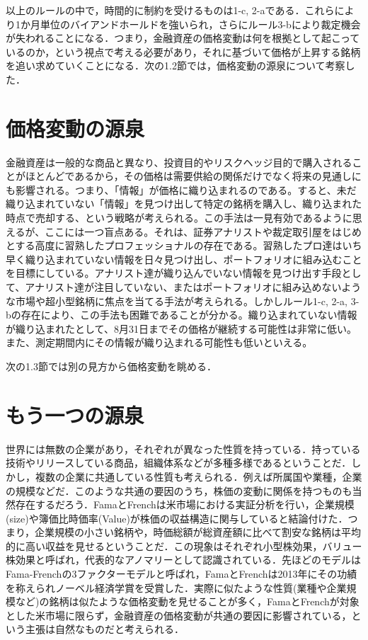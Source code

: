 \documentclass[11pt]{jreport}
\begin{document}
以上のルールの中で，時間的に制約を受けるものは1-c, 2-aである．これらにより1か月単位のバイアンドホールドを強いられ，さらにルール3-bにより裁定機会が失われることになる．つまり，金融資産の価格変動は何を根拠として起こっているのか，という視点で考える必要があり，それに基づいて価格が上昇する銘柄を追い求めていくことになる．次の1.2節では，価格変動の源泉について考察した．

\section{価格変動の源泉}
金融資産は一般的な商品と異なり、投資目的やリスクヘッジ目的で購入されることがほとんどであるから，その価格は需要供給の関係だけでなく将来の見通しにも影響される。つまり、「情報」が価格に織り込まれるのである。すると、未だ織り込まれていない「情報」を見つけ出して特定の銘柄を購入し、織り込まれた時点で売却する、という戦略が考えられる。この手法は一見有効であるように思えるが、ここには一つ盲点ある。それは、証券アナリストや裁定取引屋をはじめとする高度に習熟したプロフェッショナルの存在である。習熟したプロ達はいち早く織り込まれていない情報を日々見つけ出し、ポートフォリオに組み込むことを目標にしている。アナリスト達が織り込んでいない情報を見つけ出す手段として、アナリスト達が注目していない、またはポートフォリオに組み込めないような市場や超小型銘柄に焦点を当てる手法が考えられる。しかしルール1-c, 2-a, 3-bの存在により、この手法も困難であることが分かる。織り込まれていない情報が織り込まれたとして、8月31日までその価格が継続する可能性は非常に低い。また、測定期間内にその情報が織り込まれる可能性も低いといえる。

次の1.3節では別の見方から価格変動を眺める．
　
\section{もう一つの源泉}
世界には無数の企業があり，それぞれが異なった性質を持っている．持っている技術やリリースしている商品，組織体系などが多種多様であるということだ．しかし，複数の企業に共通している性質も考えられる．例えば所属国や業種，企業の規模などだ．このような共通の要因のうち，株価の変動に関係を持つものも当然存在するだろう．FamaとFrenchは米市場における実証分析を行い，企業規模(size)や簿価比時価率(Value)が株価の収益構造に関与していると結論付けた．つまり，企業規模の小さい銘柄や，時価総額が総資産額に比べて割安な銘柄は平均的に高い収益を見せるということだ．この現象はそれぞれ小型株効果，バリュー株効果と呼ばれ，代表的なアノマリーとして認識されている．先ほどのモデルはFama-Frenchの3ファクターモデルと呼ばれ，FamaとFrenchは2013年にその功績を称えられノーベル経済学賞を受賞した．実際に似たような性質(業種や企業規模など)の銘柄は似たような価格変動を見せることが多く，FamaとFrenchが対象とした米市場に限らず，金融資産の価格変動が共通の要因に影響されている，という主張は自然なものだと考えられる．
\end{document}
